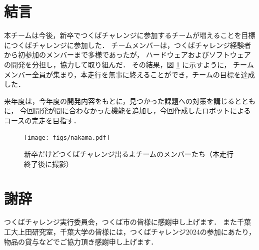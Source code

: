 \documentclass[twocolumn,9pt]{jsproceedings}
\begin{document}
\section{結言}
本チームは今後，新卒でつくばチャレンジに参加するチームが増えることを目標につくばチャレンジに参加した．
チームメンバーは，つくばチャレンジ経験者から初参加のメンバーまで多様であったが，
ハードウェアおよびソフトウェアの開発を分担し，協力して取り組んだ．
その結果，図 \ref{fig:nakama} に示すように，
チームメンバー全員が集まり，本走行を無事に終えることができ，チームの目標を達成した．

来年度は，今年度の開発内容をもとに，見つかった課題への対策を講じるとともに，
今回開発が間に合わなかった機能を追加し，今回作成したロボットによるコースの完走を目指す．

\begin{figure}[h]
  \begin{center}
    \texttt{[image: figs/nakama.pdf]}
    \caption{新卒だけどつくばチャレンジ出るよチームのメンバーたち（本走行終了後に撮影）}
    \label{fig:nakama}
  \end{center}
\end{figure}

\section*{謝辞}
つくばチャレンジ実行委員会，つくば市の皆様に感謝申し上げます．
また千葉工大上田研究室，千葉大学の皆様には，つくばチャレンジ2024の参加にあたり，物品の貸与などでご協力頂き感謝申し上げます．
\end{document}
